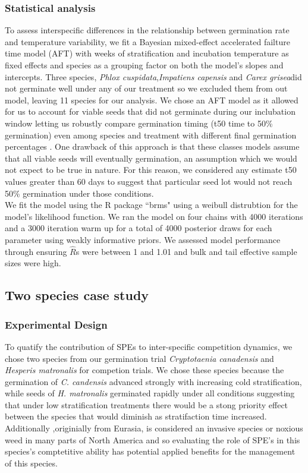 \documentclass[11pt]{article}\usepackage[]{graphicx}\usepackage[]{color}
\begin{document}
\subsubsection*{Statistical analysis}
To assess interspecific differences in the relationship between germination rate and temperature variability, we fit a Bayesian mixed-effect accelerated failture time model (AFT) with weeks of stratification and incubation temperature as fixed effects and species as a grouping factor on both the model's slopes and intercepts. Three species, \textit{Phlox cuspidata},\textit{Impatiens capensis} and \textit{Carex grisea}did not germinate well under any of our treatment so we excluded them from out model, leaving 11 species for our analysis. We chose an AFT model as it allowed for us to account for viable seeds that did not germinate during our inclubation window letting us robustly compare germination timing (t50 time to 50\% germination) even among species and treatment with different final germination percentages \citep{Soltani:2015aa}. One drawback of this approach is that these classes models assume that all viable seeds will eventually germination, an assumption which we would not expect to be true in nature. For this reason, we considered any estimate t50 values greater than 60 days to suggest that particular seed lot would not reach 50\% germination under those conditions.\\ %

\noindent We fit the model using the R package ``brms" \citep{Burkner2018} using a weibull distrubtion for the model's likelihood function. We ran the model on four chains with 4000 iterations and a 3000 iteration warm up for a total of 4000 posterior draws for each parameter using weakly informative priors. We assessed  model performance through ensuring $\hat{R}$s were between 1 and 1.01 and bulk and tail effective sample sizes were high.

\subsection{Two species case study}
\subsubsection*{Experimental Design}
To quatify the contribution of SPEs to inter-specific competition dynamics, we chose two species from our germination trial \textit{Cryptotaenia canadensis} and \textit{Hesperis matronalis} for competion trials. We chose these species because the germination of \textit{C. candensis} advanced strongly with increasing cold stratification, while seeds of \textit{H. matronalis} germinated rapidly under all conditions suggesting that under low stratification treatments there would be a stong priority effect between the species that would diminish as stratifaction time increased. Additionally ,originially from Eurasia, is considered an invasive species or noxious weed in many parts of North America and so evaluating the role of SPE's in this species's comptetitive ability has potential applied benefits for the management of this species.\\
\end{document}

